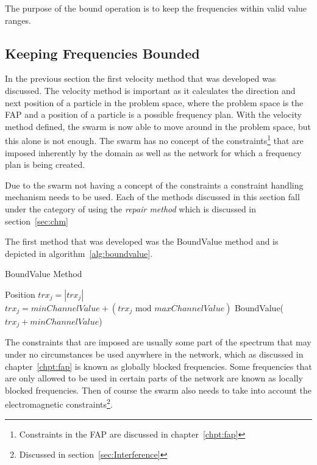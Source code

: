 The purpose of the bound operation is to keep the frequencies within valid value ranges.
\subsection{Keeping Frequencies Bounded}
In the previous section the first velocity method that was developed was discussed. The velocity method is important as it calculates the direction and next position of a particle in the problem space, where the problem space is the \gls{FAP} and a position of a particle is a possible frequency plan. With the velocity method defined, the swarm is now able to move around in the problem space, but this alone is not enough. The swarm has no concept of the constraints\footnote{Constraints in the \gls{FAP} are discussed in chapter~\ref{chpt:fap}} that are imposed inherently by the domain as well as the network for which a frequency plan is being created.

Due to the swarm not having a concept of the constraints a constraint handling mechanism needs to be used. Each of the methods discussed in this section fall under the category of using the \emph{repair method} which is discussed in section~\ref{sec:chm}

The first method that was developed was the BoundValue method and is depicted in algorithm~\ref{alg:boundvalue}.
\begin{algorithm}[H]
\caption{BoundValue Method}
\label{alg:boundvalue}
\begin{algorithmic}[1]
	\Require Position
			\State $trx_j = \left|trx_j\right|$
				\State $trx_j = minChannelValue + (\text{$trx_j$ mod $maxChannelValue$})$
			\Else 
					\State BoundValue($trx_j + minChannelValue$)
				\EndIf
			\EndIf
		\EndFor
	\EndFor
\end{algorithmic}
\end{algorithm}
The constraints that are imposed are usually some part of the spectrum that may under no circumstances be used anywhere in the network, which as discussed in chapter~\ref{chpt:fap} is known as globally blocked frequencies. Some frequencies that are only allowed to be used in certain parts of the network are known as locally blocked frequencies. Then of course the swarm also needs to take into account the electromagnetic constraints\footnote{Discussed in section~\ref{sec:Interference}}.


